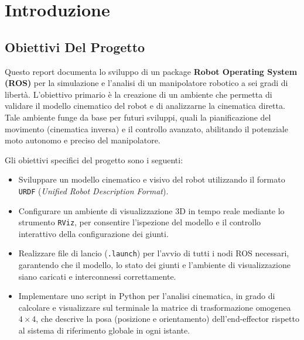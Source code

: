 \documentclass[11pt, a4paper]{report}
\begin{document}
\restoregeometry

\tableofcontents
\cleardoublepage


\chapter{Introduzione}
\section{Obiettivi Del Progetto}
Questo report documenta lo sviluppo di un package \textbf{Robot Operating System (ROS)} per la simulazione e l'analisi di un manipolatore robotico a sei gradi di libertà. L'obiettivo primario è la creazione di un ambiente che permetta di validare il modello cinematico del robot e di analizzarne la cinematica diretta. Tale ambiente funge da base per futuri sviluppi, quali la pianificazione del movimento (cinematica inversa) e il controllo avanzato, abilitando il potenziale moto autonomo e preciso del manipolatore.

Gli obiettivi specifici del progetto sono i seguenti:
\begin{itemize}
    \item Sviluppare un modello cinematico e visivo del robot utilizzando il formato \texttt{URDF} (\textit{Unified Robot Description Format}).

    \item Configurare un ambiente di visualizzazione 3D in tempo reale mediante lo strumento \texttt{RViz}, per consentire l'ispezione del modello e il controllo interattivo della configurazione dei giunti.

    \item Realizzare file di lancio (\texttt{.launch}) per l'avvio di tutti i nodi ROS necessari, garantendo che il modello, lo stato dei giunti e l'ambiente di visualizzazione siano caricati e interconnessi correttamente.

    \item Implementare uno script in Python per l'analisi cinematica, in grado di calcolare e visualizzare sul terminale la matrice di trasformazione omogenea \(4 \times 4\), che descrive la posa (posizione e orientamento) dell'end-effector rispetto al sistema di riferimento globale in ogni istante.
\end{itemize}
\end{document}
